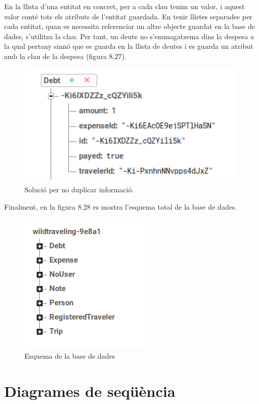 En la llista d'una entitat en concret, per a cada clau tenim un valor, i aquest valor conté tots els atributs de l'entitat guardada. En tenir llistes separades per cada entitat, quan es necessita referenciar un altre objecte guardat en la base de dades, s'utilitza la clau. Per tant, un deute no s'emmagatzema dins la despesa a la qual pertany sinnó que es guarda en la llista de deutes i es guarda un atribut amb la clau de la despesa (figura 8.27).


\begin{figure}[!h]
\centering
\includegraphics[scale=1.00]{Figures/DebtBD.jpg}
\caption{Solució per no duplicar informació.}
\end{figure}

\clearpage

Finalment, en la figura 8.28 es mostra l'esquema total de la base de dades.

\begin{figure}[!h]
\centering
\includegraphics[scale=1.00]{Figures/esquemabdGeneral.png}
\caption{Esquema de la base de dades}
\end{figure}

\section{Diagrames de seqüència}
